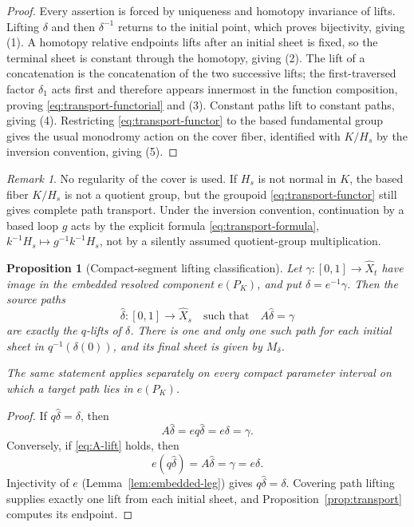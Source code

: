 \documentclass[11pt,reqno]{amsart}
\newtheorem{proposition}[theorem]{Proposition}
\theoremstyle{definition}
\theoremstyle{remark}
\newtheorem{remark}[theorem]{Remark}
\begin{document}
\begin{proof}
Every assertion is forced by uniqueness and homotopy invariance of lifts.  Lifting \( \delta \) and then \( \delta^{-1} \) returns to the initial point, which proves bijectivity, giving (1).  A homotopy relative endpoints lifts after an initial sheet is fixed, so the terminal sheet is constant through the homotopy, giving (2).  The lift of a concatenation is the concatenation of the two successive lifts; the first-traversed factor \( \delta_1 \) acts first and therefore appears innermost in the function composition, proving \eqref{eq:transport-functorial} and (3).  Constant paths lift to constant paths, giving (4).  Restricting \eqref{eq:transport-functor} to the based fundamental group gives the usual monodromy action on the cover fiber, identified with \( K/H_s \) by the inversion convention, giving (5).
\end{proof}

\begin{remark}\label{rem:no-regularity}
No regularity of the cover is used.  If \( H_s \) is not normal in \( K \), the based fiber \( K/H_s \) is not a quotient group, but the groupoid \eqref{eq:transport-functor} still gives complete path transport.  Under the inversion convention, continuation by a based loop \( g \) acts by the explicit formula \eqref{eq:transport-formula}, \( k^{-1}H_s\mapsto g^{-1}k^{-1}H_s \), not by a silently assumed quotient-group multiplication.
\end{remark}
\begin{proposition}[Compact-segment lifting classification]\label{prop:compact-lift}
Let \( \gamma\colon[0,1]\to\widehat X_t \) have image in the embedded resolved component \( e(P_K) \), and put \( \delta=e^{-1}\gamma \).  Then the source paths
\begin{equation}\label{eq:A-lift}
  \widehat\delta\colon[0,1]\to\widehat X_s
  \quad\text{such that}\quad
  A\widehat\delta=\gamma
\end{equation}
are exactly the \( q \)-lifts of \( \delta \).  There is one and only one such path for each initial sheet in \( q^{-1}(\delta(0)) \), and its final sheet is given by \( M_\delta \).

The same statement applies separately on every compact parameter interval on which a target path lies in \( e(P_K) \).
\end{proposition}

\begin{proof}
If \( q\widehat\delta=\delta \), then
\[
  A\widehat\delta=eq\widehat\delta=e\delta=\gamma .
\]
Conversely, if \eqref{eq:A-lift} holds, then
\[
  e(q\widehat\delta)=A\widehat\delta=\gamma=e\delta .
\]
Injectivity of \( e \) (Lemma~\ref{lem:embedded-leg}) gives \( q\widehat\delta=\delta \).  Covering path lifting supplies exactly one lift from each initial sheet, and Proposition~\ref{prop:transport} computes its endpoint.
\end{proof}
\end{document}
